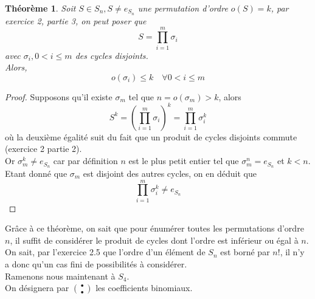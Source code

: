 \documentclass[11pt, a4paper]{article}
\newtheorem{theorem}{Théorème}
\begin{document}
\begin{theorem}
	Soit $S \in S_n, S \neq e_{S_n} $ une permutation d'ordre $o(S)=k$, par exercice 2, partie 3, on peut poser que
	\[
		S = \prod_{i=1} ^{m} \sigma_i
	\]
	avec $\sigma_i, 0<i\leq m$ des cycles disjoints.\\
	Alors,
	\[ 
		o(\sigma_i) \leq k \quad \forall 0< i \leq m
	\]
\end{theorem}
\begin{proof}
	Supposons qu'il existe $\sigma_m$ tel que $n=o(\sigma_m) > k$, alors
	 \[ 
		 S^{k}= \left(\prod_{i=1} ^{m} \sigma_i\right)^{k} = \prod_{i=1} ^{m} \sigma_i^{k}
	\]
	où la deuxième égalité suit du fait que un produit de cycles disjoints commute (exercice 2 partie 2).\\
	Or $\sigma_m^{k} \neq e_{S_n}$ car par définition $n$ est le plus petit entier tel que $\sigma_m^{n}=e_{S_n}$ et $k<n$.\\
	Etant donné que $\sigma_m$ est disjoint des autres cycles, on en déduit que 
	\[ 
\prod_{i=1} ^{m} \sigma_i^{k} \neq e_{S_n} 
	\]
\end{proof}
Grâce à ce théorème, on sait que pour énumérer toutes les permutations d'ordre $n$, il suffit de considérer le produit de cycles dont l'ordre est inférieur ou égal à $n$.\\
On sait, par l'exercice 2.5 que l'ordre d'un élément de $S_n$ est borné par $n!$, il n'y a donc qu'un cas fini de possibilités à considérer.\\
Ramenons nous maintenant à $S_4$.\\
On désignera par $\binom{\bullet}{\bullet}$ les coefficients binomiaux.
\end{document}

